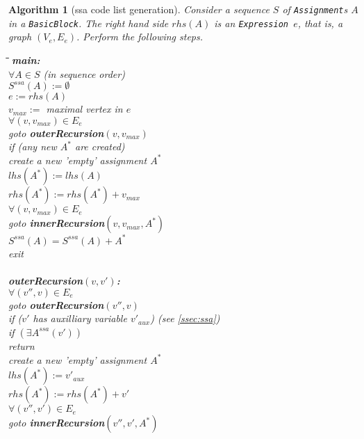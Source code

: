 \documentclass{book}
\newcommand{\Assignment}{{\tt Assignment}}
\newcommand{\BasicBlock}{{\tt BasicBlock}}
\newcommand{\Expression}{{\tt Expression}}
\newtheorem{Alg}{Algorithm}
\begin{document}
\begin{Alg}[ssa code list generation]
Consider a sequence $S$ of {\Assignment}s $A$ in a \BasicBlock. 
The right hand side $rhs(A)$ is an \Expression\ $e$, that is, a graph
$(V_e,E_e)$.
Perform the following steps.
\begin{tabbing}
\hspace*{3ex}\=\hspace*{3ex}\=\hspace*{3ex}\=\hspace*{3ex}\=\hspace*{-13ex}
{\bf main:}\\
\>$\forall  A \in S $ (in sequence order) \\
\>\> $S^{ssa}(A):=\emptyset$ \\
\>\> $e:=rhs(A)$ \\
\>\> $v_{max}:=$ maximal vertex in $e$ \\ 
\>\> $\forall (v,v_{max})\in E_e$ \\
\>\> goto {\bf outerRecursion}$(v,v_{max})$ \\ 
\>\> if (any new $A^*$ are created) \\ 
\>\>\> create a new 'empty' assignment $A^*$\\
\>\>\> $lhs(A^*):=lhs(A)$\\
\>\>\> $rhs(A^*):=rhs(A^*)+v_{max}$\\
\>\>\> $\forall (v,v_{max})\in E_e$ \\
\>\>\>\> goto {\bf innerRecursion}$(v,v_{max},A^*)$ \\ 
\>\>\> $S^{ssa}(A)=S^{ssa}(A)+A^*$ \\
\>exit\\
\\
{\bf outerRecursion$(v,v')$:}\\
\> $\forall (v'',v)\in E_e$ \\
\>\> goto {\bf outerRecursion}$(v'',v)$ \\ 
\> if ($v'$ has auxilliary variable $v'_{aux}$) (see \ref{ssec:ssa}) \\
\>\> if $(\exists A^{ssa}(v'))$\\
\>\>\> return\\
\>\> create a new 'empty' assignment $A^*$\\
\>\> $lhs(A^*):=v'_{aux}$\\
\>\> $rhs(A^*):=rhs(A^*)+v'$\\
\>\> $\forall (v'',v')\in E_e$ \\
\>\>\> goto {\bf innerRecursion}$(v'',v',A^*)$ \\ 

\end{tabbing}
\end{Alg}
\end{document}
